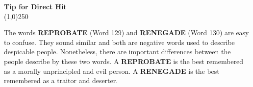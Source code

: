 \documentclass{book}
\begin{document}
\begin{enumerate}
\begin{tcolorbox}
\begin{center}
\textbf{Tip for Direct Hit}\\
\line(1,0){250}\\
\end{center}
The words \textbf{REPROBATE} (Word 129) and \textbf{RENEGADE} (Word 130) are easy to confuse. They sound similar and both are negative words used to describe despicable people. Nonetheless, there are important differences between the people describe by these two words. A  \textbf{REPROBATE} is the best remembered as a morally unprincipled and evil person. A  \textbf{RENEGADE} is the best remembered as a traitor and deserter.
\end{tcolorbox}



\end{enumerate}
\end{document}
